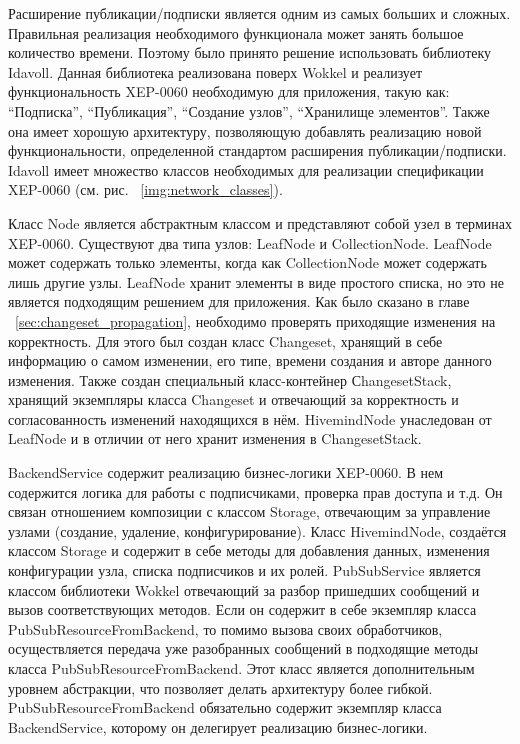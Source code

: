 Расширение публикации/подписки является одним из самых больших и сложных.
Правильная реализация необходимого функционала может занять большое количество
времени. Поэтому было принято решение использовать библиотеку Idavoll. Данная
библиотека реализована поверх Wokkel и реализует функциональность XEP-0060
необходимую для приложения, такую как: ``Подписка'', ``Публикация'', ``Создание
узлов'', ``Хранилище элементов''. Также она имеет хорошую архитектуру,
позволяющую добавлять реализацию новой функциональности, определенной стандартом
расширения публикации/подписки. Idavoll имеет множество классов необходимых для
реализации спецификации XEP-0060 (см. рис. ~\ref{img:network_classes}).

Класс Node является абстрактным классом и представляют собой узел в терминах
XEP-0060. Существуют два типа узлов: LeafNode и CollectionNode. LeafNode может
содержать только элементы, когда как CollectionNode может содержать лишь другие
узлы. LeafNode хранит элементы в виде простого списка, но это не является
подходящим решением для приложения. Как было сказано в главе
~\ref{sec:changeset_propagation}, необходимо проверять приходящие изменения на
корректность. Для этого был создан класс Changeset, хранящий в себе информацию о
самом изменении, его типе, времени создания и авторе данного изменения. Также
создан специальный класс-контейнер СhangesetStack, хранящий экземпляры класса
Changeset и отвечающий за корректность и согласованность изменений находящихся в
нём. HivemindNode унаследован от LeafNode и в отличии от него хранит изменения в
ChangesetStack.

BackendService содержит реализацию бизнес-логики XEP-0060. В нем содержится
логика для работы с подписчиками, проверка прав доступа и т.д. Он связан
отношением композиции с классом Storage, отвечающим за управление узлами
(создание, удаление, конфигурирование). Класс HivemindNode, создаётся классом
Storage и содержит в себе методы для добавления данных, изменения конфигурации
узла, списка подписчиков и их ролей. PubSubService является классом библиотеки
Wokkel отвечающий за разбор пришедших сообщений и вызов соответствующих методов.
Если он содержит в себе экземпляр класса PubSubResourceFromBackend, то помимо
вызова своих обработчиков, осуществляется передача уже разобранных сообщений в
подходящие методы класса PubSubResourceFromBackend. Этот класс является
дополнительным уровнем абстракции, что позволяет делать архитектуру более
гибкой. PubSubResourceFromBackend обязательно содержит экземпляр класса
BackendService, которому он делегирует реализацию бизнес-логики.

